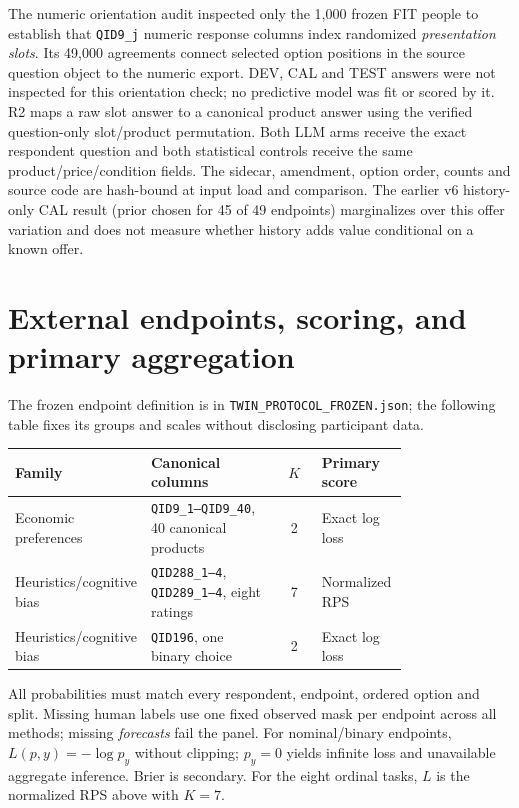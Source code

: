 \documentclass[10pt]{article}
\begin{document}
The numeric orientation audit inspected only the 1,000 frozen FIT people to
establish that \texttt{QID9\_j} numeric response columns index randomized
\emph{presentation slots}. Its 49,000 agreements connect selected option
positions in the source question object to the numeric export. DEV, CAL and
TEST answers were not inspected for this orientation check; no predictive
model was fit or scored by it. R2 maps a raw slot answer to a canonical
product answer using the verified question-only slot/product permutation.
Both LLM arms receive the exact respondent question and both statistical
controls receive the same product/price/condition fields. The sidecar,
amendment, option order, counts and source code are hash-bound at input
load and comparison. The earlier v6 history-only CAL result (prior chosen
for 45 of 49 endpoints) marginalizes over this offer variation and does
not measure whether history adds value conditional on a known offer.

\section{External endpoints, scoring, and primary aggregation}
\label{sec:external}
The frozen endpoint definition is in
\texttt{TWIN\_PROTOCOL\_FROZEN.json}; the following table fixes
its groups and scales without disclosing participant data.

\begin{center}
\begin{tabular}{@{}p{0.23\linewidth}p{0.33\linewidth}cp{0.22\linewidth}@{}}\toprule
Family & Canonical columns & $K$ & Primary score\\\midrule
Economic preferences & \texttt{QID9\_1--QID9\_40}, 40 canonical products & 2 & Exact log loss\\
Heuristics/cognitive bias & \texttt{QID288\_1--4}, \texttt{QID289\_1--4}, eight ratings & 7 & Normalized RPS\\
Heuristics/cognitive bias & \texttt{QID196}, one binary choice & 2 & Exact log loss\\
\bottomrule\end{tabular}
\end{center}

All probabilities must match every respondent, endpoint, ordered option and
split. Missing human labels use one fixed observed mask per endpoint across
all methods; missing \emph{forecasts} fail the panel. For nominal/binary
endpoints, $L(p,y)=-\log p_y$ without clipping; $p_y=0$ yields infinite loss
and unavailable aggregate inference. Brier is secondary. For the eight
ordinal tasks, $L$ is the normalized RPS above with $K=7$.
\end{document}
